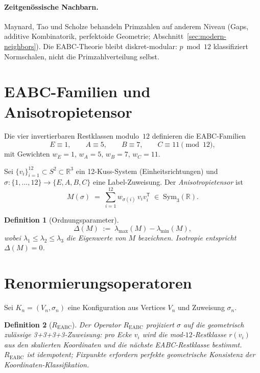 \documentclass[11pt,a4paper]{article}
\newtheorem{definition}{Definition}
\newcommand{\R}{\mathbb{R}}
\begin{document}
\paragraph{Zeitgenössische Nachbarn.}
Maynard, Tao und Scholze behandeln Primzahlen auf anderem Niveau
(Gaps, additive Kombinatorik, perfektoide Geometrie; Abschnitt~\ref{sec:modern-neighbors}).
Die EABC-Theorie bleibt diskret-modular: $p\bmod 12$ klassifiziert Normschalen,
nicht die Primzahlverteilung selbst.

\section{EABC-Familien und Anisotropietensor}

Die vier invertierbaren Restklassen modulo~$12$ definieren die EABC-Familien
\[
  E \equiv 1,\qquad A \equiv 5,\qquad B \equiv 7,\qquad C \equiv 11 \pmod{12},
\]
mit Gewichten $w_E=1$, $w_A=5$, $w_B=7$, $w_C=11$.

Sei $\{v_i\}_{i=1}^{12}\subset S^2\subset\R^3$ ein 12-Kuss-System (Einheitsrichtungen)
und $\sigma\colon\{1,\ldots,12\}\to\{E,A,B,C\}$ eine Label-Zuweisung.
Der \emph{Anisotropietensor} ist
\[
  M(\sigma)
  \;=\;
  \sum_{i=1}^{12} w_{\sigma(i)}\, v_i v_i^{\mathsf T}
  \;\in\;
  \mathrm{Sym}_3(\R).
\]

\begin{definition}[Ordnungsparameter]
\[
  \Delta(M) \;:=\; \lambda_{\max}(M) - \lambda_{\min}(M),
\]
wobei $\lambda_1\le\lambda_2\le\lambda_3$ die Eigenwerte von $M$ bezeichnen.
Isotropie entspricht $\Delta(M)=0$.
\end{definition}

\section{Renormierungsoperatoren}

Sei $K_n=(V_n,\sigma_n)$ eine Konfiguration aus Vertices $V_n$ und Zuweisung $\sigma_n$.

\begin{definition}[$R_{\mathrm{EABC}}$]
Der Operator $R_{\mathrm{EABC}}$ projiziert $\sigma$ auf die geometrisch zulässige
3+3+3+3-Zuweisung: pro Ecke $v_i$ wird die mod-$12$-Restklasse
$r(v_i)$ aus den skalierten Koordinaten und die nächste EABC-Restklasse
bestimmt. $R_{\mathrm{EABC}}$ ist idempotent; Fixpunkte erfordern perfekte
geometrische Konsistenz der Koordinaten-Klassifikation.
\end{definition}
\end{document}
